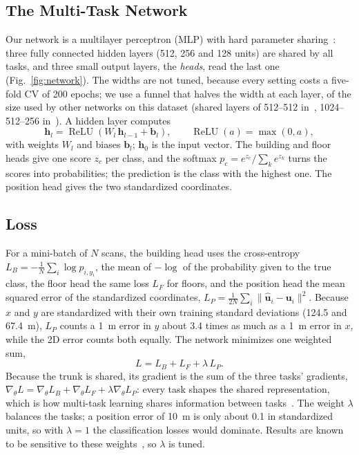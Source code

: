 \subsection{The Multi-Task Network}\label{sec:network}
Our network is a multilayer perceptron (MLP) with hard parameter
sharing~\cite{caruana1997multitask,ruder2017overview}: three fully connected
hidden layers (512, 256 and 128 units) are shared by all tasks, and three small
output layers, the \emph{heads}, read the last one (Fig.~\ref{fig:network}).
The widths are not tuned, because every setting costs a five-fold CV of 200
epochs; we use a funnel that halves the width at each layer, of the size used by
other networks on this dataset (shared layers of 512--512
in~\cite{laska2022multitask}, 1024--512--256 in~\cite{li2026hybrid}). A hidden
layer computes
\begin{equation}
  \mathbf{h}_{l}=\operatorname{ReLU}(W_{l}\,\mathbf{h}_{l-1}+\mathbf{b}_{l}),
  \qquad \operatorname{ReLU}(a)=\max(0,a),
  \label{eq:layer}
\end{equation}
with weights $W_l$ and biases $\mathbf{b}_l$; $\mathbf{h}_0$ is the input
vector. The building and floor heads give one score $z_c$ per class, and the
softmax $p_c=e^{z_c}/\sum_k e^{z_k}$ turns the scores into probabilities; the
prediction is the class with the highest one. The position head gives the two
standardized coordinates.

\subsection{Loss}\label{sec:loss}
For a mini-batch of $N$ scans, the building head uses the cross-entropy
$L_B=-\frac1N\sum_i\log p_{i,y_i}$, the mean of $-\log$ of the probability
given to the true class, the floor head the same loss $L_F$ for floors, and the
position head the mean squared error of the
standardized coordinates, $L_P=\frac1{2N}\sum_i\lVert\hat{\mathbf{u}}_i-
\mathbf{u}_i\rVert^2$. Because $x$ and $y$ are standardized with their own
training standard deviations (124.5 and 67.4~m), $L_P$ counts a 1~m error in $y$
about 3.4 times as much as a 1~m error in $x$, while the 2D error counts both
equally. The network minimizes one weighted sum,
\begin{equation}
  L = L_B + L_F + \lambda\,L_P .
  \label{eq:loss}
\end{equation}
Because the trunk is shared, its gradient is the sum of the three tasks'
gradients, $\nabla_{\theta}L=\nabla_{\theta}L_B+\nabla_{\theta}L_F+
\lambda\nabla_{\theta}L_P$: every task shapes the shared representation,
which is how multi-task learning shares information between
tasks~\cite{caruana1997multitask}. The weight $\lambda$ balances the tasks; a
position error of 10~m is only about 0.1 in standardized units, so with
$\lambda=1$ the classification losses would dominate. Results are known to be
sensitive to these weights~\cite{kendall2018multi}, so $\lambda$ is tuned.

